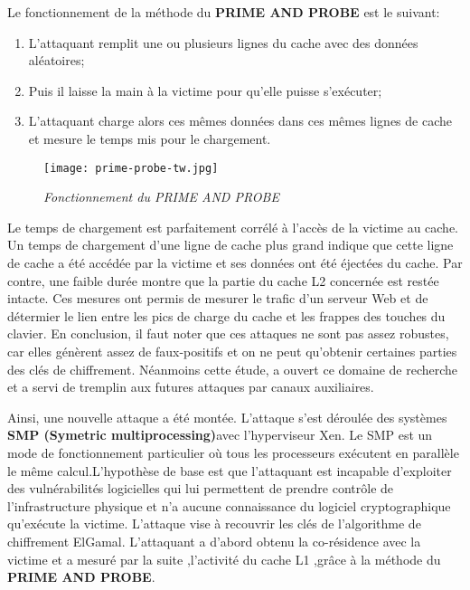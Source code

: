 Le fonctionnement de la méthode du  \textbf{ PRIME AND PROBE} \cite{Osvik} est le suivant:
\begin{enumerate}
 \item L’attaquant remplit une ou plusieurs lignes du cache avec des données aléatoires;
 \item Puis il laisse la main à la victime pour qu’elle puisse s’exécuter;
 \item L’attaquant charge alors ces mêmes  données dans ces  mêmes lignes  de cache et mesure le temps mis pour le chargement.	
\end{enumerate}

\begin{figure}[h!]
      \centering \texttt{[image: prime-probe-tw.jpg]}            
      \caption{\it Fonctionnement du PRIME AND PROBE \cite{TimeWarp} }
\end{figure}     

Le temps de chargement est parfaitement corrélé à l’accès de la victime au cache. Un temps de chargement d’une ligne de cache plus grand indique  que cette ligne de cache a été accédée par la victime et ses données ont été éjectées du cache. Par contre, une faible durée montre que la partie du cache L2 concernée est restée intacte. Ces mesures  ont permis  de mesurer le trafic d'un serveur Web et de détermier le lien entre les pics de  charge du cache  et les frappes des touches du clavier. En conclusion, il faut noter que  ces attaques ne sont pas assez robustes, car elles génèrent assez de faux-positifs et on ne peut qu’obtenir certaines parties des clés de chiffrement. Néanmoins cette étude, a ouvert  ce domaine de recherche et  a servi de tremplin aux futures attaques par canaux auxiliaires. \newline{}

\par 

Ainsi, une nouvelle attaque  a été montée\cite{Zhang2012}. L'attaque s'est déroulée des systèmes \textbf{ SMP (Symetric multiprocessing)}avec l’hyperviseur Xen. Le SMP est un mode de fonctionnement particulier où tous les processeurs exécutent en parallèle le même calcul.L’hypothèse  de base est  que l’attaquant est incapable d’exploiter des vulnérabilités logicielles qui lui permettent de prendre contrôle de l’infrastructure physique et n’a aucune  connaissance du logiciel cryptographique qu’exécute la victime. L’attaque  vise à recouvrir les clés de l’algorithme de chiffrement ElGamal\cite{ElGamal}. L'attaquant a d'abord obtenu la co-résidence avec la victime et a mesuré par la suite ,l'activité du cache  L1 ,grâce à la méthode du \textbf{PRIME AND PROBE}.  

